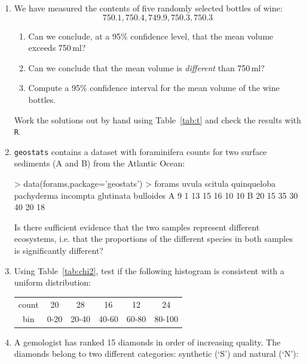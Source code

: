 \begin{enumerate}

\item\label{it:wine-t} We have measured the contents of five randomly
  selected bottles of wine:
  \[
  750.1, 750.4, 749.9, 750.3, 750.3
  \]

  \begin{enumerate}
    \item\label{it:one-sided} Can we conclude, at a 95\% confidence
      level, that the mean volume exceeds 750\,ml?
    \item\label{it:two-sided} Can we conclude that the mean volume is
      \emph{different} than 750\,ml?
    \item Compute a 95\% confidence interval for the mean volume of
      the wine bottles.
  \end{enumerate}

  Work the solutions out by hand using Table~\ref{tab:t} and check the
  results with \texttt{R}.

\item \texttt{geostats} contains a dataset with foraminifera counts
  for two surface sediments (A and B) from the Atlantic Ocean:

\begin{console}
> data(forams,package='geostats')
> forams
  uvula scitula quinqueloba pachyderma incompta glutinata bulloides
A     9       1          13         15       16        10        10
B    20      15          35         30       40        20        18
\end{console}

Is there sufficient evidence that the two samples represent different
ecosystems, i.e. that the proportions of the different species in both
samples is significantly different?
  
\item Using Table~\ref{tab:chi2}, test if the following histogram is
  consistent with a uniform distribution:
  
    \begin{tabular}{c|ccccc}
      count & 20 & 28 & 16 & 12 & 24 \\
      bin  & 0-20 & 20-40 & 40-60 & 60-80 & 80-100
    \end{tabular}

\item A gemologist has ranked 15 diamonds in order of increasing
  quality. The diamonds belong to two different categories: synthetic
  (`S') and natural (`N'):


\end{enumerate}
